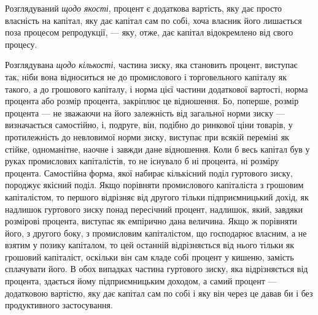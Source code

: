 Розглядуваний \emph{щодо якості}, процент є додаткова вартість,
яку дає просто власність на капітал, яку дає капітал сам по собі,
хоча власник його лишається поза процесом репродукції, — яку,
отже, дає капітал відокремлено від свого процесу.

Розглядувана \emph{щодо кількості}, частина зиску, яка становить
процент, виступає так, ніби вона відноситься не до промислового
і торговельного капіталу як такого, а до грошового
капіталу, і норма цієї частини додаткової вартості, норма процента
або розмір процента, закріплює це відношення. Бо, поперше,
розмір процента — не зважаючи на його залежність
від загальної норми зиску — визначається самостійно, і, подруге,
він, подібно до ринкової ціни товарів, у протилежність до невловимої
норми зиску, виступає при всякій переміні як стійке,
одноманітне, наочне і завжди дане відношення. Коли б весь
капітал був у руках промислових капіталістів, то не існувало
б ні процента, ні розміру процента. Самостійна форма,
якої набирає кількісний поділ гуртового зиску, породжує якісний
поділ. Якщо порівняти промислового капіталіста з грошовим
капіталістом, то першого відрізняє від другого тільки підприємницький
дохід, як надлишок гуртового зиску понад
пересічний процент, надлишок, який, завдяки розмірові процента,
виступає як емпірично дана величина. Якщо ж порівняти
його, з другого боку, з промисловим капіталістом, що
господарює власним, а не взятим у позику капіталом, то цей
останній відрізняється від нього тільки як грошовий капіталіст,
оскільки він сам кладе собі процент у кишеню, замість
сплачувати його. В обох випадках частина гуртового зиску, яка
відрізняється від процента, здається йому підприємницьким доходом,
а самий процент — додатковою вартістю, яку дає капітал
сам по собі і яку він через це давав би і без продуктивного
застосування.

